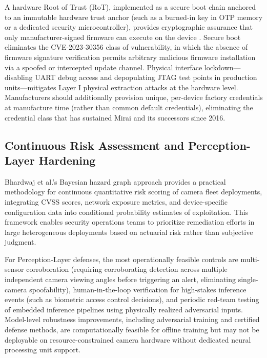 \documentclass[letterpaper, 10pt, conference]{ieeeconf}
\begin{document}
A hardware Root of Trust (RoT), implemented as a secure boot chain
anchored to an immutable hardware trust anchor (such as a burned-in
key in OTP memory or a dedicated security microcontroller), provides
cryptographic assurance that only manufacturer-signed firmware can
execute on the device \cite{jin2022edge}. Secure boot eliminates the
CVE-2023-30356 class of vulnerability, in which the absence of firmware
signature verification permits arbitrary malicious firmware installation
via a spoofed or intercepted update channel. Physical interface
lockdown---disabling UART debug access and depopulating JTAG test
points in production units---mitigates Layer I physical extraction
attacks at the hardware level. Manufacturers should additionally
provision unique, per-device factory credentials at manufacture time
(rather than common default credentials), eliminating the credential
class that has sustained Mirai and its successors since 2016.

\subsection{Continuous Risk Assessment and Perception-Layer Hardening}

Bhardwaj et al.'s Bayesian hazard graph approach \cite{bhardwaj2024}
provides a practical methodology for continuous quantitative risk
scoring of camera fleet deployments, integrating CVSS scores,
network exposure metrics, and device-specific configuration data
into conditional probability estimates of exploitation. This framework
enables security operations teams to prioritize remediation efforts
in large heterogeneous deployments based on actuarial risk rather
than subjective judgment.

For Perception-Layer defenses, the most operationally feasible controls
are multi-sensor corroboration (requiring corroborating detection
across multiple independent camera viewing angles before triggering
an alert, eliminating single-camera spoofability), human-in-the-loop
verification for high-stakes inference events (such as biometric
access control decisions), and periodic red-team testing of embedded
inference pipelines using physically realized adversarial inputs.
Model-level robustness improvements, including adversarial training
and certified defense methods, are computationally feasible for
offline training but may not be deployable on resource-constrained
camera hardware without dedicated neural processing unit support.

\end{document}

